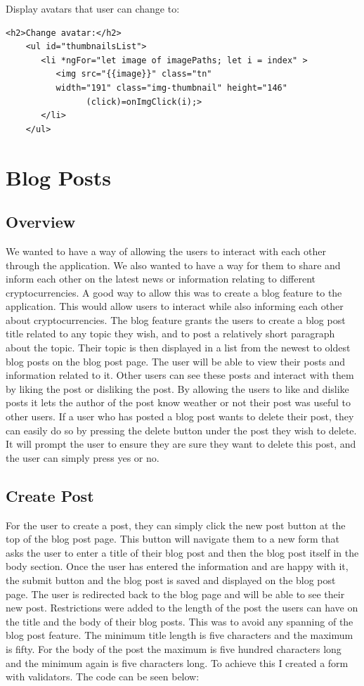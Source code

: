 Display avatars that user can change to:
\begin{lstlisting}
<h2>Change avatar:</h2>
    <ul id="thumbnailsList">
       <li *ngFor="let image of imagePaths; let i = index" >
          <img src="{{image}}" class="tn"
          width="191" class="img-thumbnail" height="146"  
                (click)=onImgClick(i);>
       </li>
    </ul>
\end{lstlisting}

\section{Blog Posts}

\subsection{Overview}
We wanted to have a way of allowing the users to interact with each other through the application. We also wanted to have a way for them to share and inform each other on the latest news or information relating to different cryptocurrencies. A good way to allow this was to create a blog feature to the application. This would allow users to interact while also informing each other about cryptocurrencies. The blog feature grants the users to create a blog post title related to any topic they wish, and to post a relatively short paragraph about the topic. Their topic is then displayed in a list from the newest to oldest blog posts on the blog post page. The user will be able to view their posts and information related to it. Other users can see these posts and interact with them by liking the post or disliking the post. By allowing the users to like and dislike posts it lets the author of the post know weather or not their post was useful to other users. If a user who has posted a blog post wants to delete their post, they can easily do so by pressing the delete button under the post they wish to delete. It will prompt the user to ensure they are sure they want to delete this post, and the user can simply press yes or no.

\subsection{Create Post}
For the user to create a post, they can simply click the new post button at the top of the blog post page. This button will navigate them to a new form that asks the user to enter a title of their blog post and then the blog post itself in the body section. Once the user has entered the information and are happy with it, the submit button and the blog post is saved and displayed on the blog post page. The user is redirected back to the blog page and will be able to see their new post. Restrictions were added to the length of the post the users can have on the title and the body of their blog posts. This was to avoid any spanning of the blog post feature. The minimum title length is five characters and the maximum is fifty. For the body of the post the maximum is five hundred characters long and the minimum again is five characters long. To achieve this I created a form with validators. The code can be seen below:


